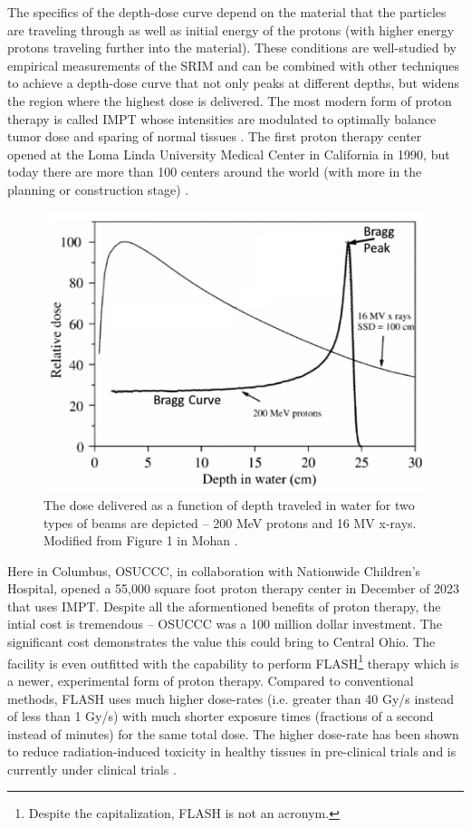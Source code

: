 The specifics of the depth-dose curve depend on the material that the particles are traveling through as well as initial energy of the protons (with higher energy protons traveling further into the material). These conditions are well-studied by empirical measurements of the \gls{SRIM} \cite{Ziegler_2010_SRIM} and can be combined with other techniques to achieve a depth-dose curve that not only peaks at different depths, but widens the region where the highest dose is delivered. The most modern form of proton therapy is called \gls{IMPT} whose intensities are modulated to optimally balance tumor dose and sparing of normal tissues \cite{Mohan_2022_PRO}. The first proton therapy center opened at the Loma Linda University Medical Center in California in 1990, but today there are more than 100 centers around the world (with more in the planning or construction stage) \cite{Mohan_2022_PRO}. 

\begin{figure}
	\centering
	\includegraphics[width=0.75\linewidth]{planning/images/bragg_curve.PNG}
	\caption{The dose delivered as a function of depth traveled in water for two types of beams are depicted -- 200 MeV protons and 16 MV x-rays. Modified from Figure 1 in Mohan \cite{Mohan_2022_PRO}.}
	\label{fig:bragg_curve}
\end{figure}
 
Here in Columbus, \gls{OSUCCC}, in collaboration with Nationwide Children's Hospital, opened a 55,000 square foot proton therapy center in December of 2023 \cite{OSU_CCC} that uses \gls{IMPT}. Despite all the aformentioned benefits of proton therapy, the intial cost is tremendous -- \gls{OSUCCC} was a 100 million dollar investment. The significant cost demonstrates the value this could bring to Central Ohio. The facility is even outfitted with the capability to perform FLASH\footnote{Despite the capitalization, FLASH is not an acronym.} therapy which is a newer, experimental form of proton therapy. Compared to conventional methods, FLASH uses much higher dose-rates (i.e. greater than 40 Gy/s instead of less than 1 Gy/s) with much shorter exposure times (fractions of a second instead of minutes) for the same total dose. The higher dose-rate has been shown to reduce radiation-induced toxicity in healthy tissues in pre-clinical trials \cite{Matuszak_2022_Onc} and is currently under clinical trials \cite{OSU_CCC}. 

